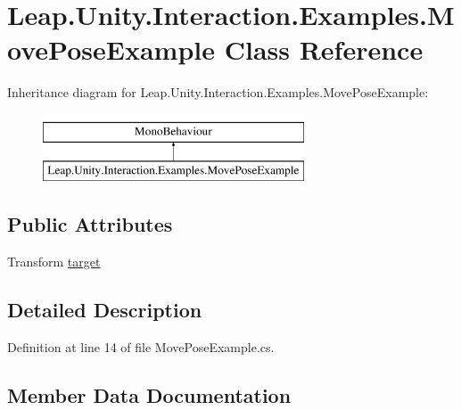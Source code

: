 \hypertarget{class_leap_1_1_unity_1_1_interaction_1_1_examples_1_1_move_pose_example}{}\section{Leap.\+Unity.\+Interaction.\+Examples.\+Move\+Pose\+Example Class Reference}
\label{class_leap_1_1_unity_1_1_interaction_1_1_examples_1_1_move_pose_example}
Inheritance diagram for Leap.\+Unity.\+Interaction.\+Examples.\+Move\+Pose\+Example\+:\begin{figure}[H]
\begin{center}
\leavevmode
\includegraphics[height=2.000000cm]{class_leap_1_1_unity_1_1_interaction_1_1_examples_1_1_move_pose_example}
\end{center}
\end{figure}
\subsection*{Public Attributes}
\begin{DoxyCompactItemize}
\item 
Transform \mbox{\hyperlink{class_leap_1_1_unity_1_1_interaction_1_1_examples_1_1_move_pose_example_a56982554ac39e2b59452d2310a1753c8}{target}}
\end{DoxyCompactItemize}


\subsection{Detailed Description}


Definition at line 14 of file Move\+Pose\+Example.\+cs.



\subsection{Member Data Documentation}
\mbox{\label{class_leap_1_1_unity_1_1_interaction_1_1_examples_1_1_move_pose_example_a56982554ac39e2b59452d2310a1753c8}} 
